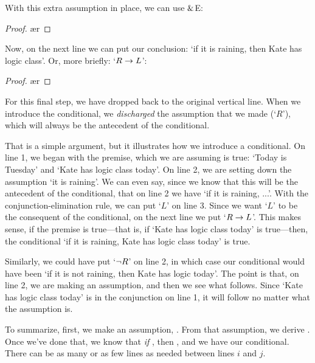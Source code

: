 With this extra assumption in place, we can use $\mathbin{\&}$E:
	\begin{proof}
		 
		\open
			 
			\ae{r}
	\end{proof}
Now, on the next line we can put our conclusion: `if it is raining, then Kate has logic class'. Or, more briefly: `$R \rightarrow L$':
	\begin{proof}
		 
		\open
			 
			\ae{r}
			\close
	\end{proof}
For this final step, we have dropped back to the original vertical line. When we introduce the conditional, we \emph{discharged} the assumption that we made (`$R$'), which will always be the antecedent of the conditional. 

That is a simple argument, but it illustrates how we introduce a conditional. On line 1, we began with the premise, which we are assuming is true: `Today is Tuesday' and `Kate has logic class today'. On line 2, we are setting down the assumption `it is raining'. We can even say, since we know that this will be the antecedent of the conditional, that on line 2 we have `if it is raining, ...'. With the conjunction-elimination rule, we can put `$L$' on line 3. Since we want `$L$' to be the consequent of the conditional, on the next line we put `$R \rightarrow L$'. This makes sense, if the premise is true---that is, if `Kate has logic class today' is true---then, the conditional `if it is raining, Kate has logic class today' is true. 

Similarly, we could have put `${\neg} R$' on line 2, in which case our conditional would have been `if it is not raining, then Kate has logic today'. The point is that, on line 2, we are making an assumption, and then we see what follows. Since `Kate has logic class today' is in the conjunction on line 1, it will follow no matter what the assumption is.

To summarize, first, we make an assumption, . From that assumption, we derive . Once we've done that, we know that \textit{if} , then , and we have our conditional. 
\noindent There can be as many or as few lines as needed between lines $i$ and $j$. 

